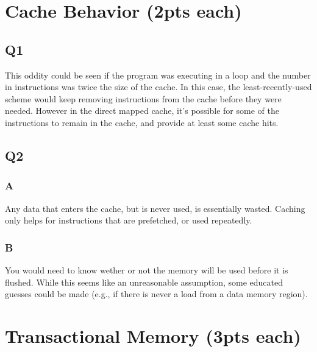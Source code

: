\documentclass{article}
\begin{document}
\section{Cache Behavior (2pts each)}
\subsection{Q1}
This oddity could be seen if the program was executing in a loop and the number in instructions was twice the size of the cache.  In this case, the least-recently-used scheme would keep removing instructions from the cache before they were needed.  However in the direct mapped cache, it's possible for some of the instructions to remain in the cache, and provide at least some cache hits.

\subsection{Q2}
\subsubsection{A}
Any data that enters the cache, but is never used, is essentially wasted.  Caching only helps for instructions that are prefetched, or used repeatedly.  

\subsubsection{B}
You would need to know wether or not the memory will be used before it is flushed.  While this seems like an unreasonable assumption, some educated guesses could be made (e.g., if there is never a  load from a data memory region).

\section{Transactional Memory (3pts each)}
\end{document}
